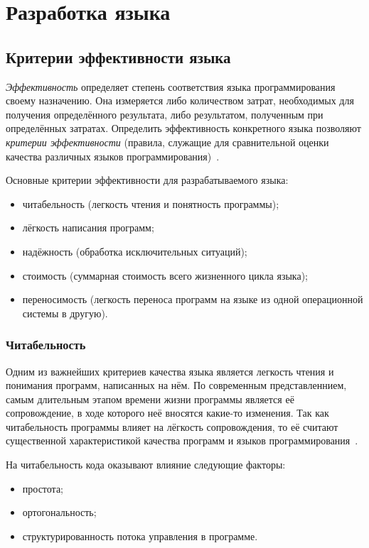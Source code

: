 \section{Разработка языка}
    \subsection{Критерии эффективности языка}
        \textit{Эффективность} определяет степень соответствия языка программирования своему назначению.
        Она измеряется либо количеством затрат, необходимых для получения определённого результата, либо результатом, полученным при определённых затратах.
        Определить эффективность конкретного языка позволяют \textit{критерии эффективности} (правила, служащие для сравнительной оценки качества различных языков программирования)~\cite{evm}.

        Основные критерии эффективности для разрабатываемого языка:
        \begin{itemize}
            \item читабельность (легкость чтения и понятность программы);
            \item лёгкость написания программ;
            \item надёжность (обработка исключительных ситуаций);
            \item стоимость (суммарная стоимость всего жизненного цикла языка);
            \item переносимость (легкость переноса программ на языке из одной операционной системы в другую).
        \end{itemize}

        \subsubsection{Читабельность}
            Одним из важнейших критериев качества языка является легкость чтения и понимания программ, написанных на нём.
            По современным представленнием, самым длительным этапом времени жизни программы является её сопровождение, в ходе которого неё вносятся какие-то изменения.
            Так как читабельность программы влияет на лёгкость сопровождения, то её считают существенной характеристикой качества программ и языков программирования~\cite{langs}.

            На читабельность кода оказывают влияние следующие факторы:
            \begin{itemize}
                \item простота;
                \item ортогональность;
                \item структурированность потока управления в программе.
            \end{itemize}

